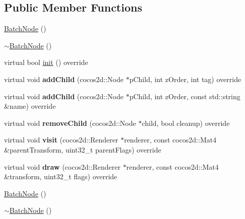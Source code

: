 \subsection*{Public Member Functions}
\begin{DoxyCompactItemize}
\item 
\hyperlink{classcocostudio_1_1BatchNode_a48ed84f76151e015d6d4487974a24cd8}{Batch\+Node} ()
\item 
\hyperlink{classcocostudio_1_1BatchNode_a33caa2c2bb460a99e0f9151866b533de}{$\sim$\+Batch\+Node} ()
\item 
virtual bool \hyperlink{classcocostudio_1_1BatchNode_a53a7a0e048482d3714ce5db81f99eb57}{init} () override
\item 
\mbox{\label{classcocostudio_1_1BatchNode_ab4c0361e81b529fcca7c7ff5475e7338}} 
virtual void {\bfseries add\+Child} (cocos2d\+::\+Node $\ast$p\+Child, int z\+Order, int tag) override
\item 
\mbox{\label{classcocostudio_1_1BatchNode_ade15e2ed45fb8727497118a8afbd6264}} 
virtual void {\bfseries add\+Child} (cocos2d\+::\+Node $\ast$p\+Child, int z\+Order, const std\+::string \&name) override
\item 
\mbox{\label{classcocostudio_1_1BatchNode_a4361e8e4a8065a5ce0888b2416677141}} 
virtual void {\bfseries remove\+Child} (cocos2d\+::\+Node $\ast$child, bool cleanup) override
\item 
\mbox{\label{classcocostudio_1_1BatchNode_ab3bc0c30cc80343b599569d02f768b65}} 
virtual void {\bfseries visit} (cocos2d\+::\+Renderer $\ast$renderer, const cocos2d\+::\+Mat4 \&parent\+Transform, uint32\+\_\+t parent\+Flags) override
\item 
\mbox{\label{classcocostudio_1_1BatchNode_a66acc5e2b0834bbcebf88acfcd187819}} 
virtual void {\bfseries draw} (cocos2d\+::\+Renderer $\ast$renderer, const cocos2d\+::\+Mat4 \&transform, uint32\+\_\+t flags) override
\item 
\hyperlink{classcocostudio_1_1BatchNode_a48ed84f76151e015d6d4487974a24cd8}{Batch\+Node} ()
\item 
\hyperlink{classcocostudio_1_1BatchNode_a33caa2c2bb460a99e0f9151866b533de}{$\sim$\+Batch\+Node} ()

\end{DoxyCompactItemize}
